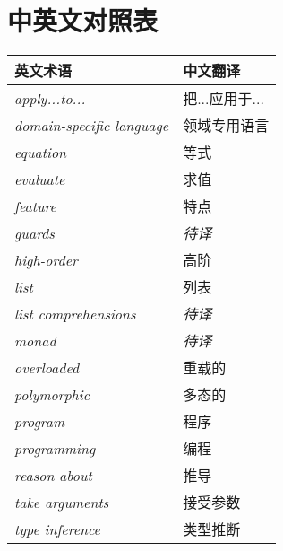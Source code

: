 \chapter*{中英文对照表}

\begin{table}[htbp]
\label{tab:threesome}
\centering
\begin{tabular}{ll}
\hline
英文术语 & 中文翻译 \\
\hline
\textit{apply...to...} & 把...应用于...\\
\textit{domain-specific language} & 领域专用语言 \\
\textit{equation} & 等式 \\
\textit{evaluate} & 求值 \\
\textit{feature} & 特点 \\
\textit{guards} & \textit{待译} \\
\textit{high-order} & 高阶 \\
\textit{list} & 列表 \\
\textit{list comprehensions} & \textit{待译}\\
\textit{monad} & \textit{待译} \\
\textit{overloaded} & 重载的 \\
\textit{polymorphic} & 多态的 \\
\textit{program} & 程序 \\
\textit{programming} & 编程 \\
\textit{reason about} & 推导 \\
\textit{take arguments} & 接受参数 \\
\textit{type inference} & 类型推断 \\

\hline
\end{tabular}
\end{table}

